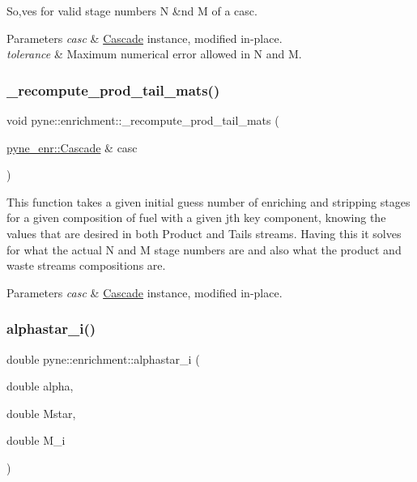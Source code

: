 So,ves for valid stage numbers N \&nd M of a casc. 
\begin{DoxyParams}{Parameters}
{\em casc} & \hyperlink{classpyne_1_1enrichment_1_1_cascade}{Cascade} instance, modified in-\/place. \\
\hline
{\em tolerance} & Maximum numerical error allowed in N and M. \\
\hline
\end{DoxyParams}
\mbox{\label{namespacepyne_1_1enrichment_ade92dd071c84c71de42599bda809af26}} 
\subsubsection{\texorpdfstring{\+\_\+recompute\+\_\+prod\+\_\+tail\+\_\+mats()}{\_recompute\_prod\_tail\_mats()}}
{\footnotesize\ttfamily void pyne\+::enrichment\+::\+\_\+recompute\+\_\+prod\+\_\+tail\+\_\+mats (\begin{DoxyParamCaption}\item[{\hyperlink{classpyne_1_1enrichment_1_1_cascade}{pyne\+\_\+enr\+::\+Cascade} \&}]{casc }\end{DoxyParamCaption})}

This function takes a given initial guess number of enriching and stripping stages for a given composition of fuel with a given jth key component, knowing the values that are desired in both Product and Tails streams. Having this it solves for what the actual N and M stage numbers are and also what the product and waste streams compositions are. 
\begin{DoxyParams}{Parameters}
{\em casc} & \hyperlink{classpyne_1_1enrichment_1_1_cascade}{Cascade} instance, modified in-\/place. \\
\hline
\end{DoxyParams}
\mbox{\label{namespacepyne_1_1enrichment_acf0727db431f65a3296233ef49456044}} 
\subsubsection{\texorpdfstring{alphastar\+\_\+i()}{alphastar\_i()}}
{\footnotesize\ttfamily double pyne\+::enrichment\+::alphastar\+\_\+i (\begin{DoxyParamCaption}\item[{double}]{alpha,  }\item[{double}]{Mstar,  }\item[{double}]{M\+\_\+i }\end{DoxyParamCaption})}

